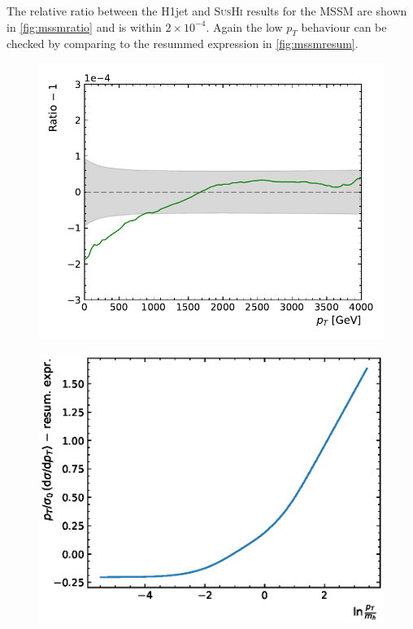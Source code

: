 \documentclass[12pt,a4wide]{article}
\begin{document}
The relative ratio between the H1jet and \textsc{SusHi} results for the MSSM are shown in \autoref{fig:mssmratio} and is within $2 \times 10^{-4}$. Again the low $p_T$ behaviour can be checked by comparing to the resummed expression in \autoref{fig:mssmresum}. 

\begin{figure}[h!] 
\centering
\begin{minipage}{.485\textwidth}
  \centering
  \includegraphics[width=\linewidth]{figures/MSSMratio}
  \label{fig:mssmratio}
\end{minipage}%
\hfill%
\begin{minipage}{.485\textwidth}
  \centering
  \includegraphics[width=\linewidth]{figures/MSSMresum}
  \label{fig:mssmresum}
\end{minipage}
\end{figure}
\end{document}
